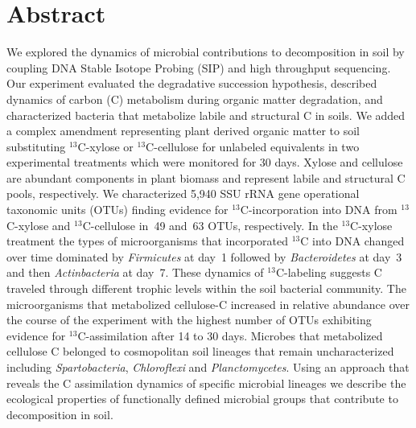 \section{Abstract} We explored the dynamics of microbial contributions to
decomposition in soil by coupling DNA Stable Isotope
Probing (SIP) and high throughput sequencing. Our experiment evaluated the
degradative succession hypothesis, described dynamics of carbon (C) metabolism
during organic matter degradation, and characterized bacteria that metabolize
labile and structural C in soils. We added a complex amendment representing
plant derived organic matter to soil substituting $^{13}$C-xylose or
$^{13}$C-cellulose for unlabeled equivalents in two experimental treatments
which were monitored for 30 days. Xylose and cellulose are abundant components
in plant biomass and represent labile and structural C pools, respectively. We
characterized 5,940 SSU rRNA gene operational taxonomic units (OTUs) finding
evidence for $^{13}$C-incorporation into DNA from $^{13}$C-xylose and
$^{13}$C-cellulose in~49 and~63 OTUs, respectively. In the $^{13}$C-xylose
treatment the types of microorganisms that incorporated $^{13}$C into DNA
changed over time dominated by \textit{Firmicutes} at day~1 followed
by \textit{Bacteroidetes} at day~3 and then \textit{Actinbacteria} at day~7.
These dynamics of $^{13}$C-labeling suggests C traveled through different
trophic levels within the soil bacterial community. The microorganisms that
metabolized cellulose-C increased in relative abundance over the course of the
experiment with the highest number of OTUs exhibiting evidence for
$^{13}$C-assimilation after 14 to 30 days. Microbes that metabolized cellulose
C belonged to cosmopolitan soil lineages that remain uncharacterized
including \textit{Spartobacteria}, \textit{Chloroflexi} and
\textit{Planctomycetes}. Using an approach that reveals the C assimilation
dynamics of specific microbial lineages we describe the ecological
properties of functionally defined microbial groups that contribute to
decomposition in soil.
